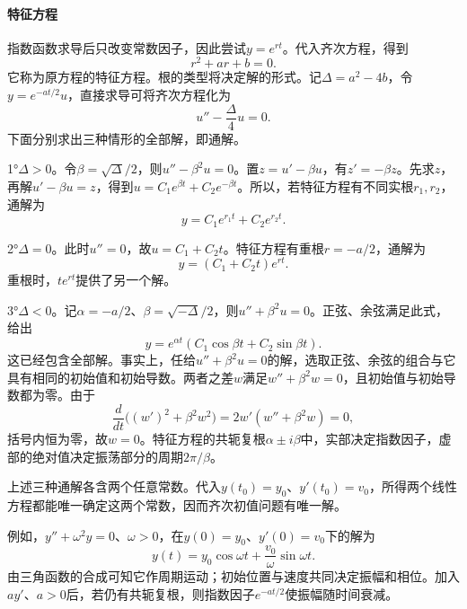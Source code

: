 \paragraph{特征方程} \mbox{}

指数函数求导后只改变常数因子，因此尝试\(y=e^{rt}\)。代入齐次方程，得到
\begin{equation}\label{eq:calculus-ode-characteristic}
 r^2+ar+b=0.
\end{equation}
它称为原方程的{\heiti{}特征方程}。根的类型将决定解的形式。记\(\Delta=a^2-4b\)，令\(y=e^{-at/2}u\)，直接求导可将齐次方程化为
\begin{equation*}
 u''-\frac\Delta4u=0.
\end{equation*}
下面分别求出三种情形的全部解，即{\heiti{}通解}。

1°\(\Delta>0\)。令\(\beta=\sqrt\Delta/2\)，则\(u''-\beta^2u=0\)。置\(z=u'-\beta u\)，有\(z'=-\beta z\)。先求\(z\)，再解\(u'-\beta u=z\)，得到\(u=C_1e^{\beta t}+C_2e^{-\beta t}\)。所以，若特征方程有不同实根\(r_1,r_2\)，通解为
\begin{equation*}
 y=C_1e^{r_1t}+C_2e^{r_2t}.
\end{equation*}

2°\(\Delta=0\)。此时\(u''=0\)，故\(u=C_1+C_2t\)。特征方程有重根\(r=-a/2\)，通解为
\begin{equation*}
 y=(C_1+C_2t)e^{rt}.
\end{equation*}
重根时，\(te^{rt}\)提供了另一个解。

3°\(\Delta<0\)。记\(\alpha=-a/2\)、\(\beta=\sqrt{-\Delta}/2\)，则\(u''+\beta^2u=0\)。正弦、余弦满足此式，给出
\begin{equation*}
 y=e^{\alpha t}(C_1\cos\beta t+C_2\sin\beta t).
\end{equation*}
这已经包含全部解。事实上，任给\(u''+\beta^2u=0\)的解，选取正弦、余弦的组合与它具有相同的初始值和初始导数。两者之差\(w\)满足\(w''+\beta^2w=0\)，且初始值与初始导数都为零。由于
\begin{equation*}
 \frac{d}{dt}\bigl((w')^2+\beta^2w^2\bigr)=2w'(w''+\beta^2w)=0,
\end{equation*}
括号内恒为零，故\(w=0\)。特征方程的共轭复根\(\alpha\pm i\beta\)中，实部决定指数因子，虚部的绝对值决定振荡部分的周期\(2\pi/\beta\)。

上述三种通解各含两个任意常数。代入\(y(t_0)=y_0\)、\(y'(t_0)=v_0\)，所得两个线性方程都能唯一确定这两个常数，因而齐次初值问题有唯一解。

例如，\(y''+\omega^2y=0\)、\(\omega>0\)，在\(y(0)=y_0\)、\(y'(0)=v_0\)下的解为
\begin{equation*}
 y(t)=y_0\cos\omega t+\frac{v_0}{\omega}\sin\omega t.
\end{equation*}
由三角函数的合成可知它作周期运动；初始位置与速度共同决定振幅和相位。加入\(ay'\)、\(a>0\)后，若仍有共轭复根，则指数因子\(e^{-at/2}\)使振幅随时间衰减。

